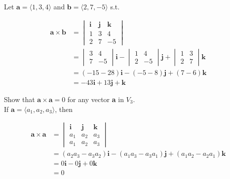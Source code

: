         \textit{} Let $\mathbf{a} = \langle 1,3,4\rangle$ and $\mathbf{b} = \langle 2,7,-5\rangle$ s.t.

        \begin{align*}
            \mathbf{a\times b}  &= \begin{vmatrix}
                                       \mathbf{i}   & \mathbf{j}    & \mathbf{k} \\
                                       1            & 3             & 4 \\
                                       2            & 7             & -5
                                   \end{vmatrix} \\
                                &= \begin{vmatrix}
                                       3 & 4 \\
                                       7 & -5
                                   \end{vmatrix} \mathbf{i} -
                                   \begin{vmatrix}
                                       1 & 4 \\
                                       2 & -5
                                   \end{vmatrix} \mathbf{j} +
                                   \begin{vmatrix}
                                       1 & 3 \\
                                       2 & 7
                                   \end{vmatrix} \mathbf{k} \\
                                &= (-15 -28)\mathbf{i} - (-5 - 8) \mathbf{j} + (7-6) \mathbf{k} \\
                                &= -43 \mathbf{i} + 13\mathbf{j} + \mathbf{k}
        \end{align*}

        \textit{} Show that $\mathbf{a}\times \mathbf{a} = 0$ for any vector \textbf{a} in $V_3$. \\
        If $\mathbf{a} = \langle a_1, a_2, a_3 \rangle$, then

        \begin{align*}
            \mathbf{a\times a}  &= \begin{vmatrix}
                                       \mathbf{i}   & \mathbf{j}    & \mathbf{k} \\
                                       a_1          & a_2           & a_3 \\
                                       a_1          & a_2           & a_3
                                   \end{vmatrix} \\
                                &= (a_2 a_3 - a_3 a_2)\mathbf{i} - (a_1 a_3 - a_3 a_1) \mathbf{j} + (a_1 a_2 - a_2 a_1) \mathbf{k} \\
                                &= 0\mathbf{i} - 0\mathbf{j} + 0\mathbf{k} \\
                                &= 0
        \end{align*}

